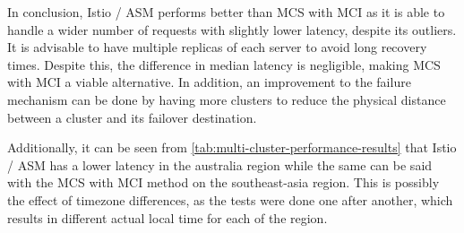 

In conclusion, Istio / ASM performs better than MCS with MCI as it is able to handle a wider number of requests with slightly lower latency, despite its outliers. It is advisable to have multiple replicas of each server to avoid long recovery times. Despite this, the difference in median latency is negligible, making MCS with MCI a viable alternative. In addition, an improvement to the failure mechanism can be done by having more clusters to reduce the physical distance between a cluster and its failover destination.

Additionally, it can be seen from \autoref{tab:multi-cluster-performance-results} that Istio / ASM has a lower latency in the australia region while the same can be said with the MCS with MCI method on the southeast-asia region. This is possibly the effect of timezone differences, as the tests were done one after another, which results in different actual local time for each of the region.